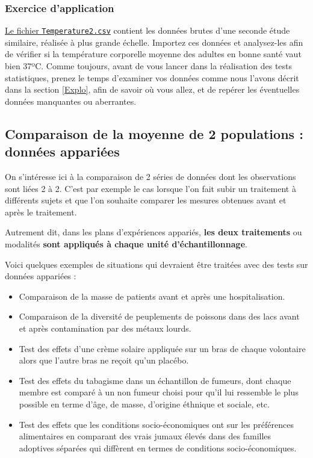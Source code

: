 \documentclass[
  a4paper,
]{article}
\providecommand{\tightlist}{%
  \setlength{\itemsep}{0pt}\setlength{\parskip}{0pt}}
\begin{document}
\hypertarget{exercice-dapplication}{%
\subsubsection{Exercice d'application}\label{exercice-dapplication}}

\href{https://besibo.github.io/Biometrie3/data/Temperature2.csv}{Le fichier \texttt{Temperature2.csv}} contient les données brutes d'une seconde étude similaire, réalisée à plus grande échelle. Importez ces données et analysez-les afin de vérifier si la température corporelle moyenne des adultes en bonne santé vaut bien 37ºC. Comme toujours, avant de vous lancer dans la réalisation des tests statistiques, prenez le temps d'examiner vos données comme nous l'avons décrit dans la section \ref{Explo}, afin de savoir où vous allez, et de repérer les éventuelles données manquantes ou aberrantes.

\hypertarget{comparaison-de-la-moyenne-de-2-populations-donnuxe9es-appariuxe9es}{%
\subsection{Comparaison de la moyenne de 2 populations : données appariées}\label{comparaison-de-la-moyenne-de-2-populations-donnuxe9es-appariuxe9es}}

On s'intéresse ici à la comparaison de 2 séries de données dont les observations sont liées 2 à 2. C'est par exemple le cas lorsque l'on fait subir un traitement à différents sujets et que l'on souhaite comparer les mesures obtenues avant et après le traitement.

Autrement dit, dans les plans d'expériences appariés, \textbf{les deux traitements} ou modalités \textbf{sont appliqués à chaque unité d'échantillonnage}.

Voici quelques exemples de situations qui devraient être traitées avec des tests sur données appariées :

\begin{itemize}
\tightlist
\item
  Comparaison de la masse de patients avant et après une hospitalisation.
\item
  Comparaison de la diversité de peuplements de poissons dans des lacs avant et après contamination par des métaux lourds.
\item
  Test des effets d'une crème solaire appliquée sur un bras de chaque volontaire alors que l'autre bras ne reçoit qu'un placébo.
\item
  Test des effets du tabagisme dans un échantillon de fumeurs, dont chaque membre est comparé à un non fumeur choisi pour qu'il lui ressemble le plus possible en terme d'âge, de masse, d'origine éthnique et sociale, etc.
\item
  Test des effets que les conditions socio-économiques ont sur les préférences alimentaires en comparant des vrais jumaux élevés dans des familles adoptives séparées qui diffèrent en termes de conditions socio-économiques.
\end{itemize}
\end{document}
